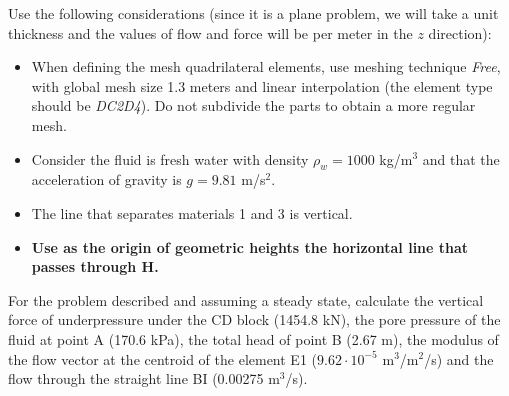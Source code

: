 Use the following considerations (since it is a plane problem, we will
take a unit thickness and the values of flow and force will be per
meter in the $ z $ direction):
\begin{itemize}
\item When defining the mesh quadrilateral elements, use meshing
  technique \textit{Free}, with global mesh size 1.3 meters and linear
  interpolation (the element type should be \textit{DC2D4}). Do not
  subdivide the parts to obtain a more regular mesh.
\item Consider the fluid is fresh water with density $\rho_w=1000$
  kg/m$^3$ and that the acceleration of gravity is $ g = 9.81 $
  m/s$^2$.
\item The line that separates materials 1 and 3 is vertical.
\item \textbf{Use as the origin of geometric heights the horizontal
    line that passes through H.}
\end{itemize}

For the problem described and assuming a steady state, calculate the
vertical force of underpressure under the CD block (1454.8 kN), the pore pressure
of the fluid at point A (170.6 kPa), the total head of point B (2.67 m), the
modulus of the flow vector at the centroid of the element E1 ($9.62\cdot 10^{-5}$ m$^3$/m$^2$/s) and the
flow through the straight line BI (0.00275 m$^3$/s).

